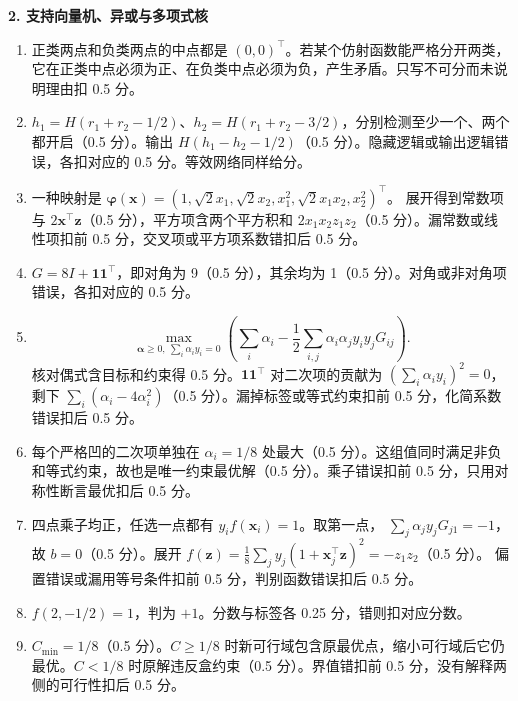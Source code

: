 \noindent\textbf{2. 支持向量机、异或与多项式核}
\begin{enumerate}[label=(\arabic*)]
\item 正类两点和负类两点的中点都是 $(0,0)^\top$。若某个仿射函数能严格分开两类，它在正类中点必须为正、在负类中点必须为负，产生矛盾。只写不可分而未说明理由扣 0.5 分。
\item $h_1=H(r_1+r_2-1/2)$、$h_2=H(r_1+r_2-3/2)$，分别检测至少一个、两个都开启（0.5 分）。输出 $H(h_1-h_2-1/2)$（0.5 分）。隐藏逻辑或输出逻辑错误，各扣对应的 0.5 分。等效网络同样给分。
\item 一种映射是
$\bm\varphi(\bm x)=(1,\sqrt{2}x_1,\sqrt{2}x_2,x_1^2,\sqrt{2}x_1x_2,x_2^2)^\top$。
展开得到常数项与 $2\bm x^\top\bm z$（0.5 分），平方项含两个平方积和 $2x_1x_2z_1z_2$（0.5 分）。漏常数或线性项扣前 0.5 分，交叉项或平方项系数错扣后 0.5 分。
\item $G=8I+\bm1\bm1^\top$，即对角为 9（0.5 分），其余均为 1（0.5 分）。对角或非对角项错误，各扣对应的 0.5 分。
\item
\[
\max_{\bm\alpha\ge0,\ \sum_i\alpha_iy_i=0}
\left(\sum_i\alpha_i-\frac12\sum_{i,j}\alpha_i\alpha_jy_iy_jG_{ij}\right).
\]
核对偶式含目标和约束得 0.5 分。$\bm1\bm1^\top$ 对二次项的贡献为 $(\sum_i\alpha_i y_i)^2=0$，剩下 $\sum_i(\alpha_i-4\alpha_i^2)$（0.5 分）。漏掉标签或等式约束扣前 0.5 分，化简系数错误扣后 0.5 分。
\item 每个严格凹的二次项单独在 $\alpha_i=1/8$ 处最大（0.5 分）。这组值同时满足非负和等式约束，故也是唯一约束最优解（0.5 分）。乘子错误扣前 0.5 分，只用对称性断言最优扣后 0.5 分。
\item 四点乘子均正，任选一点都有 $y_if(\bm x_i)=1$。取第一点，
$\sum_j\alpha_jy_jG_{j1}=-1$，故 $b=0$（0.5 分）。展开
$f(\bm z)=\frac18\sum_jy_j(1+\bm x_j^\top\bm z)^2=-z_1z_2$（0.5 分）。
偏置错误或漏用等号条件扣前 0.5 分，判别函数错误扣后 0.5 分。
\item $f(2,-1/2)=1$，判为 $+1$。分数与标签各 0.25 分，错则扣对应分数。
\item $C_{\min}=1/8$（0.5 分）。$C\ge1/8$ 时新可行域包含原最优点，缩小可行域后它仍最优。$C<1/8$ 时原解违反盒约束（0.5 分）。界值错扣前 0.5 分，没有解释两侧的可行性扣后 0.5 分。
\end{enumerate}

